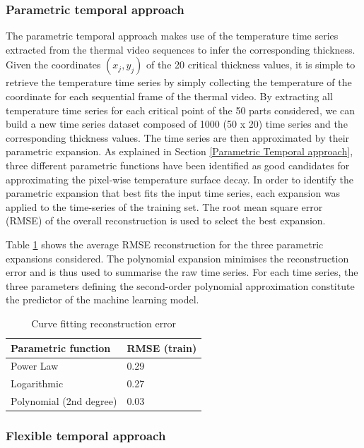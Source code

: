 \subsubsection{Parametric temporal approach}
The parametric temporal approach makes use of the temperature time series extracted from the thermal video sequences to infer the corresponding thickness. Given the coordinates $(x_j, y_j)$ of the 20 critical thickness values, it is simple to retrieve the temperature time series by simply collecting the temperature of the coordinate for each sequential frame of the thermal video. By extracting all temperature time series for each critical point of the 50 parts considered, we can build a new time series dataset composed of 1000 (50 x 20) time series and the corresponding thickness values. The time series are then approximated by their parametric expansion. As explained in Section \ref{Parametric Temporal approach}, three different parametric functions have been identified as good candidates for approximating the pixel-wise temperature surface decay. In order to identify the parametric expansion that best fits the input time series, each expansion was applied to the time-series of the training set. The root mean square error (RMSE) of the overall reconstruction is used to select the best expansion. 

Table \ref{tab:curve_fitting_error} shows the average  RMSE reconstruction for the three parametric expansions considered. The polynomial expansion minimises the reconstruction error and is thus used to summarise the raw time series. 
For each time series, the three parameters defining the second-order polynomial approximation constitute the predictor of the machine learning model.

\begin{table}
\centering
\caption{Curve fitting reconstruction error}
\begin{tabular}{ll}
\toprule
Parametric function    & RMSE (train) \\ 
\midrule

Power Law              & 0.29         \\ 
Logarithmic            & 0.27         \\ 
Polynomial (2nd degree) & 0.03         \\ 
\bottomrule
\end{tabular}
\label{tab:curve_fitting_error}
\end{table}


\subsubsection{Flexible temporal approach}

